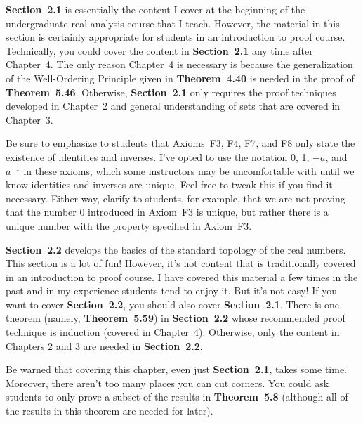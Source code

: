 \documentclass[11pt]{article}%
\newcommand{\blankline}{\pagebreak[2]\vspace{.5\baselineskip}}
\begin{document}
\blankline

\textbf{Section~2.1} is essentially the content I cover at the beginning of the undergraduate real analysis course that I teach.  However, the material in this section is certainly appropriate for students in an introduction to proof course. Technically, you could cover the content in \textbf{Section~2.1} any time after Chapter~4.  The only reason Chapter~4 is necessary is because the generalization of the Well-Ordering Principle given in \textbf{Theorem~4.40} is needed in the proof of \textbf{Theorem~5.46}.   Otherwise, \textbf{Section~2.1} only requires the proof techniques developed in Chapter~2 and general understanding of sets that are covered in Chapter~3.

\blankline

Be sure to emphasize to students that Axioms~F3, F4, F7, and F8 only state the existence of identities and inverses. I've opted to use the notation 0, 1, $-a$, and $a^{-1}$ in these axioms, which some instructors may be uncomfortable with until we know identities and inverses are unique. Feel free to tweak this if you find it necessary. Either way, clarify to students, for example, that we are not proving that the number $0$ introduced in Axiom~F3 is unique, but rather there is a unique number with the property specified in Axiom~F3.

\blankline

\textbf{Section~2.2} develops the basics of the standard topology of the real numbers.  This section is a lot of fun!  However, it's not content that is traditionally covered in an introduction to proof course.  I have covered this material a few times in the past and in my experience students tend to enjoy it.  But it's not easy!  If you want to cover \textbf{Section~2.2}, you should also cover \textbf{Section~2.1}.  There is one theorem (namely, \textbf{Theorem~5.59}) in \textbf{Section~2.2} whose recommended proof technique is induction (covered in Chapter~4).  Otherwise, only the content in Chapters 2 and 3 are needed in \textbf{Section~2.2}.

\blankline

Be warned that covering this chapter, even just \textbf{Section~2.1}, takes some time.  Moreover, there aren't too many places you can cut corners.  You could ask students to only prove a subset of the results in \textbf{Theorem~5.8} (although all of the results in this theorem are needed for later).

\end{document}
